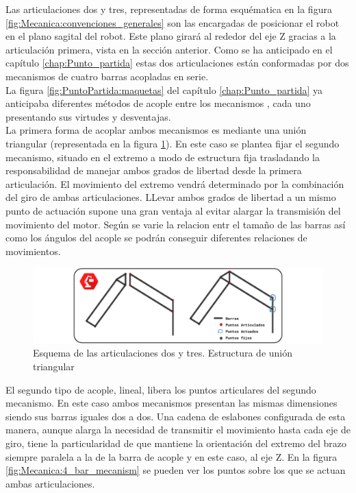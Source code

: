     Las articulaciones dos y tres, representadas de forma esquématica en la figura \ref{fig:Mecanica:convenciones_generales} son las encargadas de posicionar el robot en el plano sagital del robot. Este plano girará al rededor del eje Z gracias a la articulación primera, vista en la sección anterior. Como se ha anticipado en el capítulo \ref{chap:Punto_partida} estas dos articulaciones están conformadas por dos mecanismos de cuatro barras acopladas en serie.
    \\

    La figura \ref{fig:PuntoPartida:maquetas} del capítulo \ref{chap:Punto_partida} ya anticipaba diferentes métodos de acople entre los mecanismos , cada uno presentando sus virtudes y desventajas.
    \\

    La primera forma de acoplar ambos mecanismos es mediante una unión triangular (representada en la figura \ref{fig:Mecanica:4_bar_mecanism_triangle}). En este caso se plantea fijar el segundo mecanismo, situado en el extremo a modo de estructura fija trasladando la responsabilidad de manejar ambos grados de libertad desde la primera articulación. El movimiento del extremo vendrá determinado por la combinación del giro de ambas articulaciones. LLevar ambos grados de libertad a un mismo punto de actuación supone una gran ventaja al evitar alargar la transmisión del movimiento del motor. Según se varie la relacion entr el tamaño de las barras así como los ángulos del acople se podrán conseguir diferentes relaciones de movimientos.

    \begin{figure}[H]
       	\centering
       	\includegraphics[width=\textwidth]{figuras/Imagenes_Mecanica/mecanismos_4_barras_triangulo.jpg}
       	\caption{Esquema de las articulaciones dos y tres. Estructura de unión triangular}
       	\label{fig:Mecanica:4_bar_mecanism_triangle}
    \end{figure}

    El segundo tipo de acople, lineal, libera los puntos articulares del segundo mecanismo. En este caso ambos mecanismos presentan las mismas dimensiones siendo sus barras iguales dos a dos. Una cadena de eslabones configurada de esta manera, aunque alarga la necesidad de transmitir el movimiento hasta cada eje de giro, tiene la particularidad de que mantiene la orientación del extremo del brazo siempre paralela a la de la barra de acople y en este caso, al eje Z. En la figura \ref{fig:Mecanica:4_bar_mecanism} se pueden ver los puntos sobre los que se actuan ambas articulaciones.
    \\

